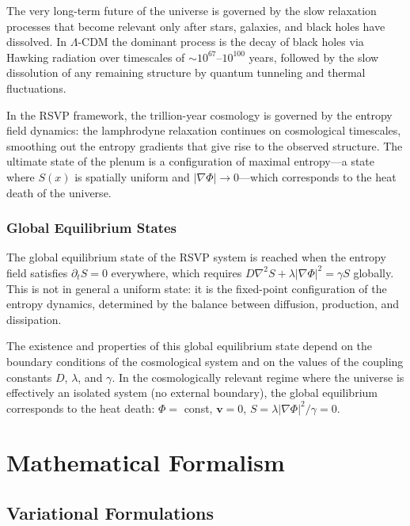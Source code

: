 \documentclass[12pt,a4paper,oneside]{book}
\theoremstyle{definition}
\theoremstyle{plain}
\theoremstyle{remark}
\begin{document}
The very long-term future of the universe is governed by the slow relaxation
processes that become relevant only after stars, galaxies, and black holes
have dissolved. In $\Lambda$-CDM the dominant process is the decay of black
holes via Hawking radiation over timescales of $\sim 10^{67}$--$10^{100}$
years, followed by the slow dissolution of any remaining structure by quantum
tunneling and thermal fluctuations.

In the RSVP framework, the trillion-year cosmology is governed by the entropy
field dynamics: the lamphrodyne relaxation continues on cosmological timescales,
smoothing out the entropy gradients that give rise to the observed structure.
The ultimate state of the plenum is a configuration of maximal entropy---a
state where $S(x)$ is spatially uniform and $|\nabla\Phi| \to 0$---which
corresponds to the heat death of the universe.

\section{Global Equilibrium States}

The global equilibrium state of the RSVP system is reached when the entropy
field satisfies $\partial_t S = 0$ everywhere, which requires
$D\nabla^2 S + \lambda|\nabla\Phi|^2 = \gamma S$ globally. This is not in
general a uniform state: it is the fixed-point configuration of the entropy
dynamics, determined by the balance between diffusion, production, and
dissipation.

The existence and properties of this global equilibrium state depend on the
boundary conditions of the cosmological system and on the values of the
coupling constants $D$, $\lambda$, and $\gamma$. In the cosmologically
relevant regime where the universe is effectively an isolated system (no
external boundary), the global equilibrium corresponds to the heat death:
$\Phi = $ const, $\mathbf{v} = 0$, $S = \lambda|\nabla\Phi|^2/\gamma = 0$.

\part{Mathematical Formalism}

\chapter{Variational Formulations}
\end{document}

